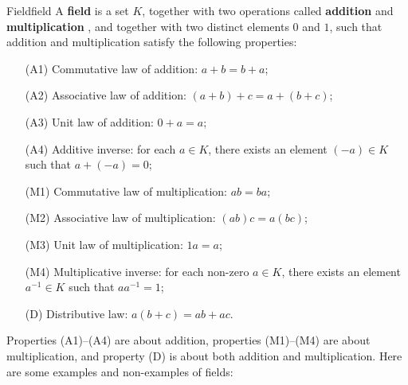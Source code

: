\begin{definition}{Field}{field}
  A \textbf{field}%
   is a set $K$, together with two operations called
  \textbf{addition}%
   and \textbf{multiplication}%
  , and together with two distinct
  elements $0$ and $1$, such that addition and multiplication satisfy
  the following properties:
  \begin{itemize}\setlength\itemsep{0em}
  \item[(A1)] {Commutative law of addition:} $a+b=b+a$;
  \item[(A2)] {Associative law of addition:} $(a+b)+c = a+(b+c)$;
  \item[(A3)] {Unit law of addition:} $0+a = a$;
  \item[(A4)] {Additive inverse:} for each $a\in K$, there exists an element $(-a)\in K$ such that $a+(-a)=0$;
  \item[(M1)] {Commutative law of multiplication:} $ab=ba$;
  \item[(M2)] {Associative law of multiplication:} $(ab)c=a(bc)$;
  \item[(M3)] {Unit law of multiplication:} $1a=a$;
  \item[(M4)] {Multiplicative inverse:} for each non-zero $a\in K$, there exists an element $a^{-1}\in K$ such that $aa^{-1}=1$;
  \item[(D)] {Distributive law:} $a(b+c)=ab+ac$.
  \end{itemize}
\end{definition}

Properties (A1)--(A4) are about addition, properties (M1)--(M4) are
about multiplication, and property (D) is about both addition and
multiplication. Here are some examples and non-examples of fields:

